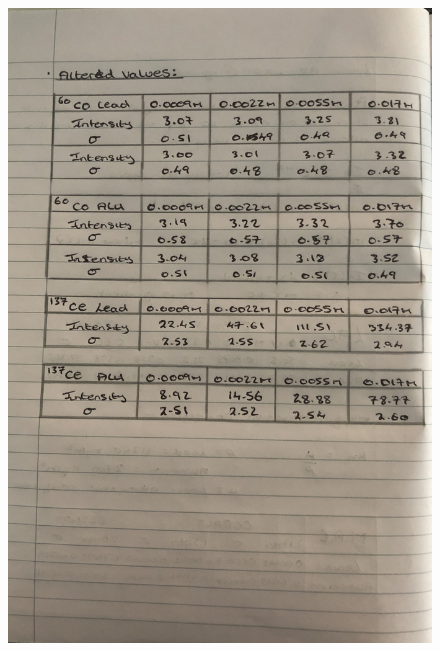 \documentclass[12pt]{article}
\begin{document}
\begin{figure}[H]
\centering
\includegraphics[scale=0.18]{Images/IMG_0337.JPG}
\end{figure}


\end{document}
